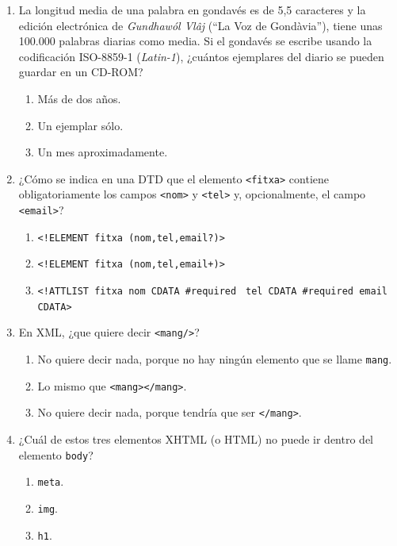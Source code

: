 \begin{enumerate}
\item La longitud media de una palabra en gondavés es de 5,5 caracteres y la edición electrónica de \emph{Gundhawól Vlâj} (``La Voz de Gondàvia''), tiene unas 100.000 palabras diarias como media. Si el gondavés se escribe usando la codificación ISO-8859-1 (\emph{Latin-1}), ¿cuántos ejemplares del diario se pueden guardar en un CD-ROM? \begin{enumerate} \item Más de dos años. \item Un ejemplar sólo. \item Un mes aproximadamente. \end{enumerate} 

\item ¿Cómo se indica en una DTD que el elemento \verb|<fitxa>| contiene obligatoriamente los campos \verb|<nom>| y \verb|<tel>| y, opcionalmente, el campo \verb|<email>|? \begin{enumerate} \item \verb|<!ELEMENT fitxa (nom,tel,email?)>| \item \verb|<!ELEMENT fitxa (nom,tel,email+)>| \item \verb|<!ATTLIST fitxa nom CDATA #required| \newline\verb| tel CDATA #required email CDATA>| \end{enumerate} 

\item En XML, ¿que quiere decir \texttt{<mang/>}? \begin{enumerate} \item No quiere decir nada, porque no hay ningún elemento que se llame \texttt{mang}. \item Lo mismo que \texttt{<mang></mang>}. \item No quiere decir nada, porque tendría que ser \texttt{</mang>}. \end{enumerate} 

\item ¿Cuál de estos tres elementos XHTML (o HTML) no puede ir dentro del elemento \texttt{body}? \begin{enumerate} \item \texttt{meta}. \item \texttt{img}. \item \texttt{h1}. \end{enumerate} 


\end{enumerate}
